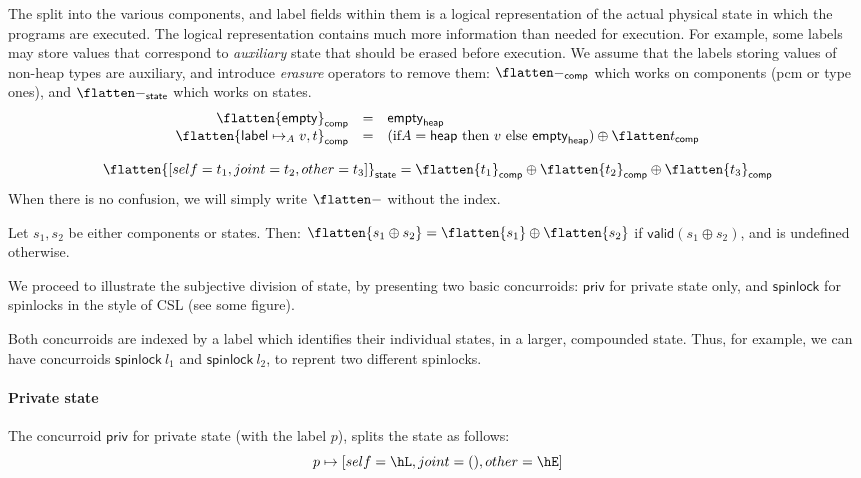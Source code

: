 The split into the various components, and label fields within them is
a logical representation of the actual physical state in which the
programs are executed. The logical representation contains much more
information than needed for execution. For example, some labels may
store values that correspond to \emph{auxiliary} state that should be
erased before execution. We assume that the labels storing values of
non-heap types are auxiliary, and introduce \emph{erasure} operators
to remove them: ${\flatten -}_\mathsf{comp}$ which works on components
(pcm or type ones), and ${\flatten -}_{\mathsf{state}}$ which works on
states.
\[
\begin{array}{rcl}
\flatten{\mathsf{empty}}_{\mathsf{comp}} & = & \mathsf{empty}_\mathsf{heap}\\
\flatten{\mathsf{label}\mapsto_A v, t}_{\mathsf{comp}} & = & 
  (\mbox{if} A = \mathsf{heap}\ \mbox{then}\ v\ \mbox{else}\ \mathsf{empty}_\mathsf{heap}) \oplus {\flatten t}_{\mathsf{comp}}
\end{array}
\]

\[
\flatten{[self=t_1, joint=t_2, other=t_3]}_{\mathsf{state}} = \flatten{t_1}_{\mathsf{comp}} \oplus \flatten{t_2}_{\mathsf{comp}} \oplus \flatten{t_3}_{\mathsf{comp}}
\]
When there is no confusion, we will simply write $\flatten -$ without
the index.

\begin{lemma}\label{lemma:join-valid}
 Let $s_1, s_2$ be either components or states. Then: $\flatten{s_1
   \oplus s_2} = \flatten{s_1} \oplus \flatten{s_2}$ if
 $\mathsf{valid} (s_1 \oplus s_2)$, and is undefined otherwise.
\end{lemma}



We proceed to illustrate the subjective division of state, by
presenting two basic concurroids: $\mathsf{priv}$ for private state
only, and $\mathsf{spinlock}$ for spinlocks in the style of CSL (see
some figure).

Both concurroids are indexed by a label which identifies their
individual states, in a larger, compounded state. Thus, for example,
we can have concurroids $\mathsf{spinlock}\ l_1$ and
$\mathsf{spinlock}\ l_2$, to reprent two different spinlocks.

\paragraph{Private state}

The concurroid $\mathsf{priv}$ for private state (with the label $p$),
splits the state as follows:
\[
p \mapsto [self = \hL, joint = (), other = \hE]
\]

